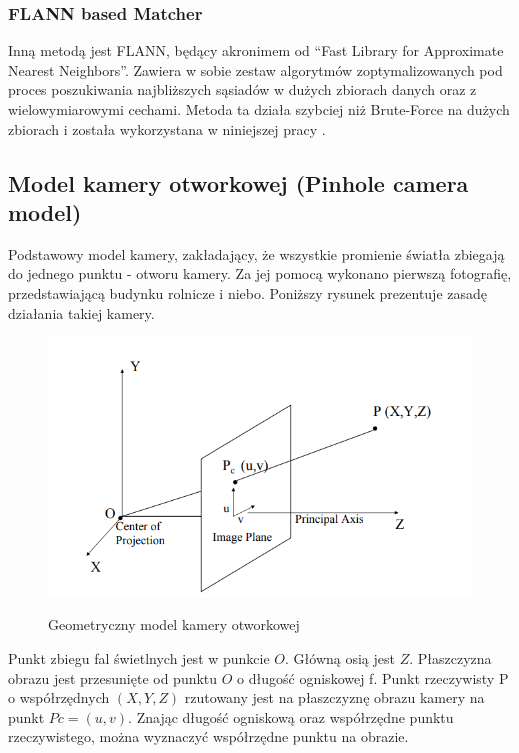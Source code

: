 \documentclass[12pt,twoside,polish]{article}
\begin{document}
\subsubsection{FLANN based Matcher}
Inną metodą jest FLANN, będący akronimem od \enquote{Fast Library for Approximate Nearest Neighbors}. Zawiera w sobie zestaw algorytmów zoptymalizowanych pod proces poszukiwania najbliższych sąsiadów w dużych zbiorach danych oraz z wielowymiarowymi cechami. Metoda ta działa szybciej niż Brute-Force na dużych zbiorach i została wykorzystana w niniejszej pracy \cite[s.575]{learnopencv}.

\subsection[Model kamery otworkowej]{Model kamery otworkowej (Pinhole camera model)}
Podstawowy model kamery, zakładający, że wszystkie promienie światła zbiegają do jednego punktu - otworu kamery. Za jej pomocą wykonano pierwszą fotografię, przedstawiającą budynku rolnicze i niebo. Poniższy rysunek prezentuje zasadę działania takiej kamery.

\begin{figure}[h]
	\centering	
	\includegraphics[width=\textwidth]{pinhole_model_img}
	\label{pinhole_model}
	\caption{Geometryczny model kamery otworkowej \cite{cameralib}}
\end{figure}

Punkt zbiegu fal świetlnych jest w punkcie $O$. Główną osią jest $Z$. Płaszczyzna obrazu jest przesunięte od punktu $O$ o długość ogniskowej f. Punkt rzeczywisty P o współrzędnych $(X,Y,Z)$ rzutowany jest na płaszczyznę obrazu kamery na punkt $Pc=(u,v)$. Znając długość ogniskową oraz współrzędne punktu rzeczywistego, można wyznaczyć współrzędne punktu na obrazie.
\end{document}
